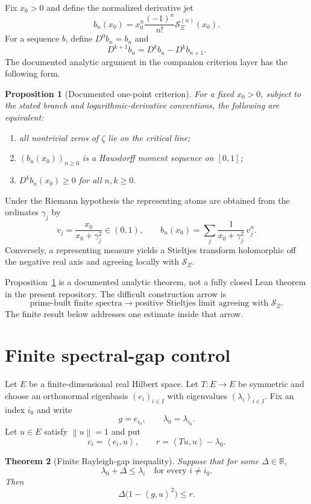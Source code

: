 \documentclass[11pt]{article}
\newtheorem{theorem}{Theorem}[section]
\newtheorem{proposition}[theorem]{Proposition}
\theoremstyle{definition}
\newcommand{\RR}{\mathbb{R}}
\newcommand{\XiR}{\mathcal{S}_{\Xi}}
\newcommand{\ip}[2]{\left\langle #1,#2\right\rangle}
\newcommand{\norm}[1]{\left\lVert #1\right\rVert}
\begin{document}
Fix $x_0>0$ and define the normalized derivative jet
\[
 b_n(x_0)=x_0^n\frac{(-1)^n}{n!}\XiR^{(n)}(x_0).
\]
For a sequence $b$, define $D^0b_n=b_n$ and
\[
 D^{k+1}b_n=D^kb_n-D^kb_{n+1}.
\]
The documented analytic argument in the companion criterion layer has the
following form.

\begin{proposition}[Documented one-point criterion]\label{prop:hausdorff}
For a fixed $x_0>0$, subject to the stated branch and logarithmic-derivative
conventions, the following are equivalent:
\begin{enumerate}[label=(\alph*)]
  \item all nontrivial zeros of $\zeta$ lie on the critical line;
  \item $(b_n(x_0))_{n\geq0}$ is a Hausdorff moment sequence on $[0,1]$;
  \item $D^kb_n(x_0)\geq0$ for all $n,k\geq0$.
\end{enumerate}
\end{proposition}

Under the Riemann hypothesis the representing atoms are obtained from the
ordinates $\gamma_j$ by
\[
 v_j=\frac{x_0}{x_0+\gamma_j^2}\in(0,1),
 \qquad
 b_n(x_0)=\sum_j\frac{1}{x_0+\gamma_j^2}\,v_j^n.
\]
Conversely, a representing measure yields a Stieltjes transform holomorphic
off the negative real axis and agreeing locally with $\XiR$.

Proposition~\ref{prop:hausdorff} is a documented analytic theorem, not a fully
closed Lean theorem in the present repository.  The difficult construction
arrow is
\[
 \text{prime-built finite spectra}
 \longrightarrow
 \text{positive Stieltjes limit agreeing with }\XiR.
\]
The finite result below addresses one estimate inside that arrow.

\section{Finite spectral-gap control}

Let $E$ be a finite-dimensional real Hilbert space.  Let
$T:E\to E$ be symmetric and choose an orthonormal eigenbasis
$(e_i)_{i\in I}$ with eigenvalues $(\lambda_i)_{i\in I}$.  Fix an index
$i_0$ and write
\[
 g=e_{i_0},\qquad \lambda_0=\lambda_{i_0}.
\]
Let $u\in E$ satisfy $\norm{u}=1$ and put
\[
 c_i=\ip{e_i}{u},
 \qquad
 r=\ip{Tu}{u}-\lambda_0.
\]

\begin{theorem}[Finite Rayleigh-gap inequality]\label{thm:gap}
Suppose that for some $\Delta\in\RR$,
\[
 \lambda_0+\Delta\leq\lambda_i
 \quad\text{for every }i\neq i_0.
\]
Then
\[
 \Delta\bigl(1-\ip{g}{u}^2\bigr)\leq r.
\]
\end{theorem}
\end{document}

